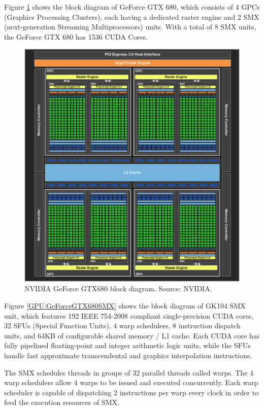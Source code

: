 Figure \ref{GPU:GeForceGTX680BlockDiagram} shows the block diagram of GeForce GTX 680, which consists of 4 GPCs (Graphics Processing Clusters), each having a dedicated raster engine and 2 SMX (next-generation Streaming Multiprocessors) units. With a total of 8 SMX units, the GeForce GTX 680 has 1536 CUDA Cores.

\begin{figure}
\centering
\includegraphics[width=\textwidth]{GPU/GeForceGTX680BlockDiagram.png}
\caption{NVIDIA GeForce GTX680 block diagram. Source: NVIDIA.}
\label{GPU:GeForceGTX680BlockDiagram}
\end{figure}

Figure \ref{GPU:GeForceGTX680SMX} shows the block diagram of GK104 SMX unit, which features 192 IEEE 754-2008 compliant single-precision CUDA cores, 32 SFUs (Special Function Units), 4 warp schedulers, 8 instruction dispatch units, and 64KB of configurable shared memory / L1 cache. Each CUDA core has fully pipelined floating-point and integer arithmetic logic units, while the SFUs handle fast approximate transcendental and graphics interpolation instructions.

The SMX schedules threads in groups of 32 parallel threads called warps. The 4 warp schedulers allow 4 warps to be issued and executed concurrently. Each warp scheduler is capable of dispatching 2 instructions per warp every clock in order to feed the execution resources of SMX.

